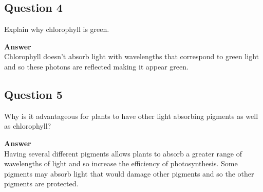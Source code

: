 \documentclass{article}
\begin{document}
\subsection*{Question 4}
Explain why chlorophyll is green.

\textbf{Answer}\\
Chlorophyll doesn't absorb light with wavelengths that correspond to green light
and so these photons are reflected making it appear green.

\subsection*{Question 5}
Why is it advantageous for plants to have other light absorbing pigments as well
as chlorophyll?

\textbf{Answer}\\
Having several different pigments allows plants to absorb a greater range of
wavelengths of light and so increase the efficiency of photosynthesis. Some
pigments may absorb light that would damage other pigments and so the other
pigments are protected.
\end{document}
